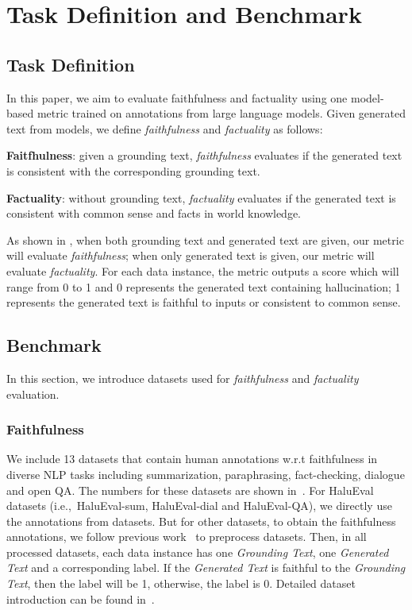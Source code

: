 \section{Task Definition and Benchmark}
\subsection{Task Definition}
In this paper, we aim to evaluate faithfulness and factuality using one model-based metric trained on annotations from large language models. Given generated text from models, we define \textit{faithfulness} and \textit{factuality} as follows:

\textbf{Faitfhulness}: given a grounding text, \textit{faithfulness} evaluates if the generated text is consistent with the corresponding grounding text.

\textbf{Factuality}: without grounding text, \textit{factuality} evaluates if the generated text is consistent with common sense and facts in world knowledge.

As shown in , when both grounding text and generated text are given, our metric will evaluate \textit{faithfulness}; when only generated text is given, our metric will evaluate \textit{factuality}. For each data instance, the metric outputs a score which will range from 0 to 1 and 0 represents the generated text containing hallucination; 1 represents the generated text is faithful to inputs or consistent to common sense.


\subsection{Benchmark}
\label{sec:benchmark}
In this section, we introduce datasets used for \textit{faithfulness} and \textit{factuality} evaluation.
\subsubsection{Faithfulness}
\label{sec:bench_faithfulness}
We include 13 datasets that contain human annotations w.r.t faithfulness in diverse NLP tasks including summarization, paraphrasing, fact-checking, dialogue and open QA. The numbers for these datasets are shown in~. For HaluEval datasets (i.e.,~HaluEval-sum, HaluEval-dial and HaluEval-QA), we directly use the annotations from datasets. But for other datasets, to obtain the faithfulness annotations, we follow previous work~\cite{Honovich2022TRUERF} to preprocess datasets. Then, in all processed datasets, each data instance has one \textit{Grounding Text}, one \textit{Generated Text} and a corresponding label. If the \textit{Generated Text} is faithful to the \textit{Grounding Text}, then the label will be 1, otherwise, the label is 0. Detailed dataset introduction can be found in~.


